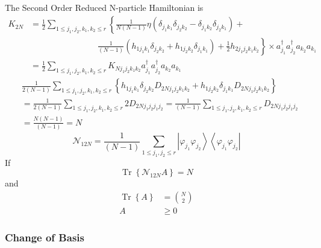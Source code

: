 \documentclass[aps,preprint]{revtex4}%
\begin{document}
The Second Order Reduced N-particle Hamiltonian is
\begin{align}
K_{2N}  &  =\frac{1}{2}\sum_{1\leq j_{1},j_{2},k_{1},k_{2}\leq r}\left\{
\frac{1}{N\left(  N-1\right)  }\eta\left(  \delta_{j_{1}k_{1}}\delta
_{j_{2}k_{2}}-\delta_{j_{1}k_{2}}\delta_{j_{2}k_{1}}\right)  \right.
+\nonumber\\
&  \qquad\qquad\qquad\qquad\left.  \frac{1}{\left(  N-1\right)  }\left(
h_{1j_{1}k_{1}}\delta_{j_{2}k_{2}}+h_{1j_{2}k_{2}}\delta_{j_{1}k_{1}}\right)
+\frac{1}{2}h_{2j_{1}j_{2}k_{1}k_{2}}\right\}  \times a_{j_{1}}^{\dagger
}a_{j_{2}}^{\dagger}a_{k_{2}}a_{k_{1}}\nonumber\\
&  =\frac{1}{2}\sum_{1\leq j_{1},j_{2},k_{1},k_{2}\leq r}K_{Nj_{1}j_{2}%
k_{1}k_{2}}a_{j_{1}}^{\dagger}a_{j_{2}}^{\dagger}a_{k_{2}}a_{k_{1}}%
\end{align}%
\begin{align}
&  \frac{1}{2\left(  N-1\right)  }\sum_{1\leq j_{1},j_{2},k_{1},k_{2}\leq
r}\left\{  h_{1j_{1}k_{1}}\delta_{j_{2}k_{2}}D_{2Nj_{1}j_{2}k_{1}k_{2}%
}+h_{1j_{2}k_{2}}\delta_{j_{1}k_{1}}D_{2Nj_{1}j_{2}k_{1}k_{2}}\right\}
\nonumber\\
&  =\frac{1}{2\left(  N-1\right)  }\sum_{1\leq j_{1},j_{2},k_{1},k_{2}\leq
r}2D_{2Nj_{1}j_{2}j_{1}j_{2}}=\frac{1}{\left(  N-1\right)  }\sum_{1\leq
j_{1},j_{2},k_{1},k_{2}\leq r}D_{2Nj_{1}j_{2}j_{1}j_{2}}\nonumber\\
&  =\frac{N\left(  N-1\right)  }{\left(  N-1\right)  }=N
\end{align}%
\begin{equation}
\mathcal{N}_{12N}=\frac{1}{\left(  N-1\right)  }\sum_{1\leq j_{1},j_{2}\leq
r}\left\vert \varphi_{j_{1}}\varphi_{j_{2}}\right\rangle \left\langle
\varphi_{j_{1}}\varphi_{j_{2}}\right\vert
\end{equation}
If
\begin{equation}
\operatorname{Tr}\left\{  \mathcal{N}_{12N}A\right\}  =N
\end{equation}
and
\begin{align}
\operatorname{Tr}\left\{  A\right\}   &  =\binom{N}{2}\\
A  &  \geq0
\end{align}


\subsubsection{Change of Basis}%
\end{document}
